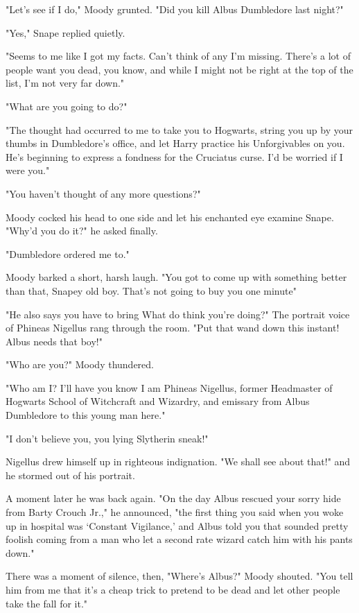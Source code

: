 "Let's see if I do," Moody grunted. "Did you kill Albus Dumbledore last night?"

"Yes," Snape replied quietly.

"Seems to me like I got my facts. Can't think of any I'm missing. There's a lot of people want you dead, you know, and while I might not be right at the top of the list, I'm not very far down."

"What are you going to do?"

"The thought had occurred to me to take you to Hogwarts, string you up by your thumbs in Dumbledore's office, and let Harry practice his Unforgivables on you. He's beginning to express a fondness for the Cruciatus curse. I'd be worried if I were you."

"You haven't thought of any more questions?"

Moody cocked his head to one side and let his enchanted eye examine Snape. "Why'd you do it?" he asked finally.

"Dumbledore ordered me to."

Moody barked a short, harsh laugh. "You got to come up with something better than that, Snapey old boy. That's not going to buy you one minute{\el}"

"He also says you have to bring{\el} What do think you're doing?" The portrait voice of Phineas Nigellus rang through the room. "Put that wand down this instant! Albus needs that boy!"

"Who are you?" Moody thundered.

"Who am I? I'll have you know I am Phineas Nigellus, former Headmaster of Hogwarts School of Witchcraft and Wizardry, and emissary from Albus Dumbledore to this young man here."

"I don't believe you, you lying Slytherin sneak!"

Nigellus drew himself up in righteous indignation. "We shall see about that!" and he stormed out of his portrait.

A moment later he was back again. "On the day Albus rescued your sorry hide from Barty Crouch Jr.," he announced, "the first thing you said when you woke up in hospital was `Constant Vigilance,' and Albus told you that sounded pretty foolish coming from a man who let a second rate wizard catch him with his pants down."

There was a moment of silence, then, "Where's Albus?" Moody shouted. "You tell him from me that it's a cheap trick to pretend to be dead and let other people take the fall for it."


